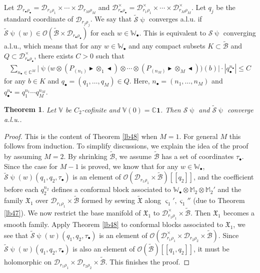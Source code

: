 \documentclass[12pt,a4paper,notitlepage]{article}
\theoremstyle{definition}
\theoremstyle{plain}
\newtheorem{thm}[df]{Theorem}
\newcommand{\fk}{\mathfrak}
\newcommand{\mc}{\mathcal}
\newcommand{\wtd}{\widetilde}
\newcommand{\id}{\mathbf{1}}
\newcommand{\scr}{\mathscr}
\newcommand{\sgm}{\varsigma}
\newcommand{\blt}{\bullet}
\newcommand{\Vbb}{\mathbb V}
\newcommand{\Wbb}{\mathbb W}
\newcommand{\Mbb}{\mathbb M}
\newcommand{\Cbb}{\mathbb C}
\newcommand{\btl}{\blacktriangleleft}
\newcommand{\btr}{\blacktriangleright}
\numberwithin{equation}{section}
\begin{document}
Let $\mc D_{r_\blt\rho_\blt}=\mc D_{r_1\rho_1}\times\cdots\times\mc D_{r_M\rho_M}$ and $\mc D_{r_\blt\rho_\blt}^\times=\mc D_{r_1\rho_1}^\times\times\cdots\times\mc D_{r_M\rho_M}^\times$. Let $q_j$ be the standard coordinate of $\mc D_{r_j\rho_j}$. We say that $\wtd{\mc S}\uppsi$ converges a.l.u. if $\wtd{\mc S}\uppsi(w)\in\scr O(\wtd{\mc B}\times\mc D_{r_\blt\rho_\blt})$ for each $w\in\Wbb_\blt$. This is equivalent to $\mc S\uppsi$ converging a.l.u., which means that for any $w\in\Wbb_\blt$ and any compact subsets $K\subset\wtd{\mc B}$ and $Q\subset\mc D_{r_\blt\rho_\blt}^\times$, there exists $C>0$ such that
\begin{align*}
\sum_{n_\blt\in\Cbb^M}\Big|\uppsi\Big(w\otimes (P_{(n_1)}\btr\otimes_1\btl)\otimes\cdots\otimes (P_{(n_M)}\btr\otimes_M\btl)\Big)(b)   \Big|\cdot |q_\blt^{n_\blt}|\leq C
\end{align*}
for any $b\in K$ and $q_\blt=(q_1,\dots,q_M)\in Q$. Here, $n_\blt=(n_1,\dots,n_M)$ and $q_\blt^{n_\blt}=q_1^{n_1}\cdots q_M^{n_M}$.




\begin{thm}\label{lb55}
Let $\Vbb$ be $C_2$-cofinite and $\Vbb(0)=\Cbb\id$. Then $\mc S\uppsi$ and $\wtd{\mc S}\uppsi$ converge a.l.u..
\end{thm}



\begin{proof}
This is the content of Theorem \ref{lb48} when $M=1$. For general $M$ this follows from induction. To simplify discussions, we explain the idea of the proof by assuming $M=2$. By shrinking $\wtd{\mc B}$, we assume $\wtd{\mc B}$ has a set of coordinates $\tau_\blt$. Since the case for $M-1$ is proved,  we know that for any $w\in\Wbb_\blt$, $\wtd{\mc S}\uppsi(w)(q_1,q_2,\tau_\blt)$ is an element of $\scr O(\mc D_{r_1\rho_1}\times\wtd{\mc B})[[q_2]]$, and the coefficient before each $q_2^{n_2}$ defines a  conformal block associated to $\Wbb_\blt\otimes\Mbb_2\otimes\Mbb_2'$ and the  family $\fk X_1$ over $\mc D_{r_1\rho_1}\times\wtd{\mc B}$ formed by sewing $\wtd{\fk X}$ along $\sgm_1',\sgm_1''$ (due to Theorem \ref{lb47}). We now restrict the base manifold of $\fk X_1$ to $\mc D_{r_1\rho_1}^\times\times\wtd{\mc B}$. Then $\fk X_1$ becomes a smooth family. Apply Theorem \ref{lb48} to conformal blocks associated to $\fk X_1$, we see that $\wtd{\mc S}\uppsi(w)(q_1,q_2,\tau_\blt)$ is an element of $\scr O(\mc D_{r_1\rho_1}^\times\times\mc D_{r_2\rho_2}\times\wtd{\mc B})$. Since $\wtd{\mc S}\uppsi(w)(q_1,q_2,\tau_\blt)$ is also an element of $\scr O(\wtd{\mc B})[[q_1,q_2]]$, it must be holomorphic on $\mc D_{r_1\rho_1}\times\mc D_{r_2\rho_2}\times\wtd{\mc B}$. This finishes the proof.
\end{proof}
\end{document}

